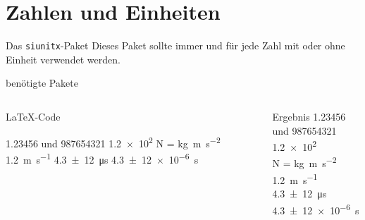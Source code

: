 \section{Zahlen und Einheiten}

\begin{frame}[fragile]{
  Das \texttt{siunitx}-Paket
  \hfill{}
}
  Dieses Paket sollte immer und für jede Zahl mit oder ohne Einheit verwendet werden.

  \begin{block}{benötigte Pakete}
    \begin{lstverbatim}
    \usepackage[locale=DE, separate-uncertainty=true, per-mode=fraction]
    {siunitx}
    \end{lstverbatim}
  \end{block}
  \begin{columns}[T]
    \begin{column}{0.6\textwidth}
      \begin{block}{\LaTeX-Code}
        \begin{lstverbatim}
        \num{1.23456} und \num{987654321}
        \num{1.2e2}
        \si{\newton} = \si{\kilo\gram\metre\per\second\squared}
        \SI{1.2}{\metre\per\second}
        \SI{4,3(12)}{\micro\second}
        \SI{4,3(12)e-6}{\second}
        \end{lstverbatim}
      \end{block}
    \end{column}
    \begin{column}{0.35\textwidth}
      \begin{block}{Ergebnis}
        \num{1.23456} und \num{987654321} \\
        \num{1.2e2} \\
        \smallbreak
        \si{\newton} = \si{\kilo\gram\metre\per\second\squared} \\
        \medbreak
        \SI{1.2}{\metre\per\second} \\
        \SI{4,3(12)}{\micro\second}
        \SI{4,3(12)e-6}{\second}
      \end{block}
    \end{column}
  \end{columns}
\end{frame}
